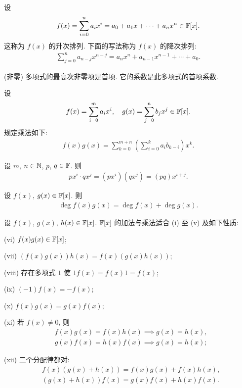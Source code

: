 \begin{definition}
    设
    \begin{align*}
        f(x) = \sum_{i=0}^n a_i x^i = a_0 + a_1 x + \cdots + a_n x^n \in \mathbb{F}[x].
    \end{align*}
    这称为 $f(x)$ 的升次排列. 下面的写法称为 $f(x)$ 的降次排列:
    \begin{align*}
        \sum_{j=0}^{n} a_{n-j} x^{n-j} = a_n x^n + a_{n-1} x^{n-1} + \cdots + a_0.
    \end{align*}

    (非零) 多项式的最高次非零项是首项. 它的系数是此多项式的首项系数.
\end{definition}

\begin{definition}
    设
    \begin{align*}
        f(x) = \sum_{i=0}^m a_i x^i, \quad g(x) = \sum_{j=0}^n b_j x^j \in \mathbb{F}[x].
    \end{align*}
    规定乘法如下:
    \begin{align*}
        f(x) g(x) = \sum_{k=0}^{m+n} \left( \sum_{i=0}^k a_i b_{k-i} \right) x^k.
    \end{align*}
\end{definition}

\begin{proposition}
    设 $m$, $n \in \mathbb{N}$, $p$, $q \in \mathbb{F}$. 则
    \begin{align*}
        px^i \cdot qx^j = (px^i) (qx^j) = (pq)x^{i + j}.
    \end{align*}
\end{proposition}

\begin{proposition}
    设 $f(x)$, $g(x) \in \mathbb{F}[x]$. 则
    \begin{align*}
        \deg f(x) g(x) = \deg f(x) + \deg g(x).
    \end{align*}
\end{proposition}

\begin{proposition}
    设 $f(x)$, $g(x)$, $h(x) \in \mathbb{F}[x]$. $\mathbb{F}[x]$ 的加法与乘法适合 (i) 至 (v) 及如下性质:

    (vi) $f(x) g(x) \in \mathbb{F}[x]$;

    (vii) $(f(x) g(x)) h(x) = f(x) (g(x) h(x))$;

    (viii) 存在多项式 $1$ 使 $1f(x) = f(x)1 = f(x)$;

    (ix) $(-1)f(x) = -f(x)$;

    (x) $f(x) g(x) = g(x) f(x)$;

    (xi) 若 $f(x) \neq 0$, 则
    \begin{align*}
         & f(x) g(x) = f(x) h(x) \implies g(x) = h(x), \\
         & g(x) f(x) = h(x) f(x) \implies g(x) = h(x);
    \end{align*}

    (xii) 二个分配律都对:
    \begin{align*}
         & f(x) (g(x) + h(x)) = f(x) g(x) + f(x) h(x), \\
         & (g(x) + h(x)) f(x) = g(x) f(x) + h(x) f(x).
    \end{align*}
\end{proposition}

